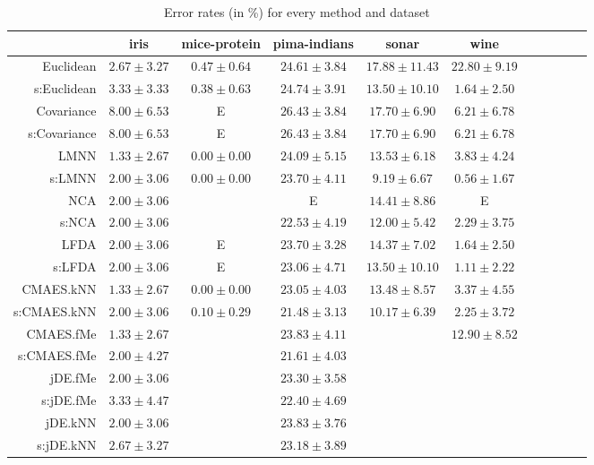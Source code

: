\begin{table}[ht]
{\begin{tabular}{rcccccccccc}
\midrule
& \multicolumn{1}{c}{iris} & \multicolumn{1}{c}{mice-protein} & \multicolumn{1}{c}{pima-indians} & \multicolumn{1}{c}{sonar} & \multicolumn{1}{c}{wine} \\ 
\midrule
Euclidean & $2.67\pm3.27$ & $0.47\pm0.64$ & $24.61\pm3.84$ & $17.88\pm11.43$ & $22.80\pm9.19$ \\
s:Euclidean & $3.33\pm3.33$ & $0.38\pm0.63$ & $24.74\pm3.91$ & $13.50\pm10.10$ & $1.64\pm2.50$ \\
Covariance & $8.00\pm6.53$ & E  & $26.43\pm3.84$ & $17.70\pm6.90$ & $6.21\pm6.78$ \\
s:Covariance & $8.00\pm6.53$ & E  & $26.43\pm3.84$ & $17.70\pm6.90$ & $6.21\pm6.78$ \\
LMNN & $\bm{1.33\pm2.67}$ & $\bm{0.00\pm0.00}$ & $24.09\pm5.15$ & $13.53\pm6.18$ & $3.83\pm4.24$ \\
s:LMNN & $2.00\pm3.06$ & $\bm{0.00\pm0.00}$ & $23.70\pm4.11$ & $\bm{9.19\pm6.67}$ & $\bm{0.56\pm1.67}$ \\
NCA & $2.00\pm3.06$ &  & E  & $14.41\pm8.86$ & E  \\
s:NCA & $2.00\pm3.06$ &  & $22.53\pm4.19$ & $12.00\pm5.42$ & $2.29\pm3.75$ \\
LFDA & $2.00\pm3.06$ & E  & $23.70\pm3.28$ & $14.37\pm7.02$ & $1.64\pm2.50$ \\
s:LFDA & $2.00\pm3.06$ & E  & $23.06\pm4.71$ & $13.50\pm10.10$ & $1.11\pm2.22$ \\
CMAES.kNN & $\bm{1.33\pm2.67}$ & $\bm{0.00\pm0.00}$ & $23.05\pm4.03$ & $13.48\pm8.57$ & $3.37\pm4.55$ \\
s:CMAES.kNN & $2.00\pm3.06$ & $0.10\pm0.29$ & $\bm{21.48\pm3.13}$ & $10.17\pm6.39$ & $2.25\pm3.72$ \\
CMAES.fMe & $\bm{1.33\pm2.67}$ &  & $23.83\pm4.11$ &  & $12.90\pm8.52$ \\
s:CMAES.fMe & $2.00\pm4.27$ &  & $21.61\pm4.03$ &  &  \\
jDE.fMe & $2.00\pm3.06$ &  & $23.30\pm3.58$ &  &  \\
s:jDE.fMe & $3.33\pm4.47$ &  & $22.40\pm4.69$ &  &  \\
jDE.kNN & $2.00\pm3.06$ &  & $23.83\pm3.76$ &  &  \\
s:jDE.kNN & $2.67\pm3.27$ &  & $23.18\pm3.89$ &  &  \\


\bottomrule
\end{tabular}
}
\caption{Error rates (in \%) for every method and dataset} \label{tab:errors-small}
\end{table}
